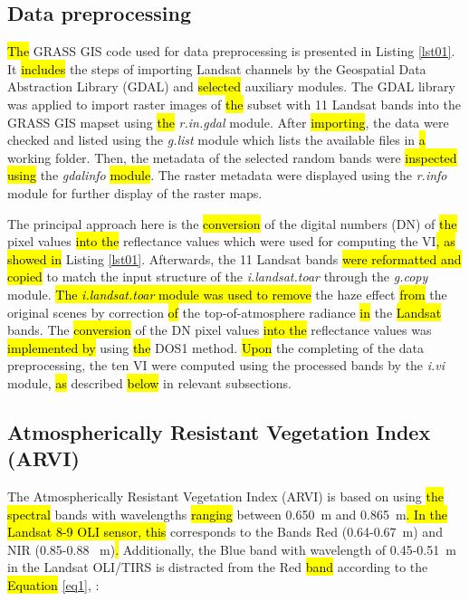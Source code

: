 \documentclass[jmse,article,submit,pdftex,moreauthors]{Definitions/mdpi}
\begin{document}
\subsection{Data preprocessing}

\hl{The }GRASS GIS code used for data preprocessing is presented in Listing \ref{lst01}. It \hl{includes} the steps of importing Landsat channels by the Geospatial Data Abstraction Library (GDAL) and \hl{selected }auxiliary modules. The GDAL library was applied to import raster images of \hl{the }subset with 11 Landsat bands into the GRASS GIS mapset using \hl{the} \emph{r.in.gdal} module. After \hl{importing}, the data were checked and listed using the \emph{g.list} module which lists the available files in \hl{a} working folder. Then, the metadata of the selected random bands were \hl{inspected using} the \emph{gdalinfo} \hl{module}. The raster metadata were displayed using the \emph{r.info} module for further display of the raster maps. 

The principal approach here is the \hl{conversion} of the digital numbers (DN) of \hl{the }pixel values \hl{into the} reflectance values which were used for computing the VI\hl{, as showed in }Listing \ref{lst01}. Afterwards, the\hl{ }11 Landsat bands \hl{were reformatted and copied }to match the input structure of the \emph{i.landsat.toar} through the \emph{g.copy} module. \hl{The \emph{i.landsat.toar} module was used to remove} the haze effect \hl{from} the original scenes by correction \hl{of }the top-of-atmosphere radiance \hl{in} the \hl{Landsat }bands. The \hl{conversion} of the DN pixel values \hl{into the} reflectance values was \hl{implemented by} using \hl{the }DOS1 method. \hl{Upon} the completing of the data preprocessing, the ten VI were computed using the processed bands by the \emph{i.vi} module, \hl{as }described \hl{below }in relevant subsections. 

\subsection{Atmospherically Resistant Vegetation Index (ARVI)}

The Atmospherically Resistant Vegetation Index (ARVI) is based on using \hl{the spectral }bands with wavelengths \hl{ranging }between 0.650~{\textmu}m and 0.865~{\textmu}m\hl{. In the Landsat 8-9 OLI sensor, this }corresponds to the Bands Red (0.64-0.67~{\textmu}m) and NIR (0.85-0.88 ~{\textmu}m)\hl{. }Additionally, the Blue band with\hl{ }wavelength of 0.45-0.51~{\textmu}m in the Landsat OLI/TIRS is distracted from the Red \hl{band }according to the\hl{ Equation }\ref{eq1}, \cite{134076,HUETE1997440}:
\end{document}
